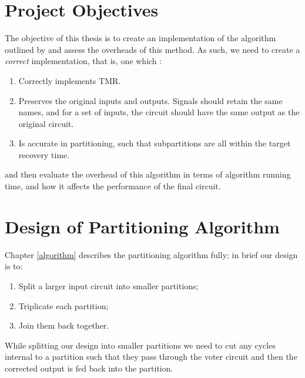 \documentclass[12pt,final,oneside,a4paper]{dwThesis} %
\begin{document}
   \section{Project Objectives}
   \label{secObjectives}
   The objective of this thesis is to create an implementation of the algorithm
   outlined by \cite{DiesselChange} and assess the overheads of this method.  As
   such, we need to create a \textit{correct} implementation, that is, one which
   :
   \begin{enumerate}

      \item Correctly implements TMR.
      \item Preserves the original inputs and outputs. Signals should retain
         the same names, and for a set of inputs, the circuit should have
         the same output as the original circuit.
      \item Is accurate in partitioning, such that subpartitions are all
         within the target recovery time.  
   \end{enumerate}
   and then
   evaluate the overhead of this algorithm in terms of algorithm running
   time, and how it affects the performance of the final circuit.

   \section{Design of Partitioning Algorithm} \label{DesignEstimates}
    Chapter \ref{algorithm} describes the partitioning algorithm fully; in brief our design is to:
    \begin{enumerate}
    	\item Split a larger input circuit into smaller partitions;
    	\item Triplicate each partition;
    	\item Join them back together.
\end{enumerate}
    While splitting our design into smaller partitions we need to cut any cycles internal to a partition such that they pass through
    the voter circuit and then the corrected output is fed back into the partition.
    
\end{document}
